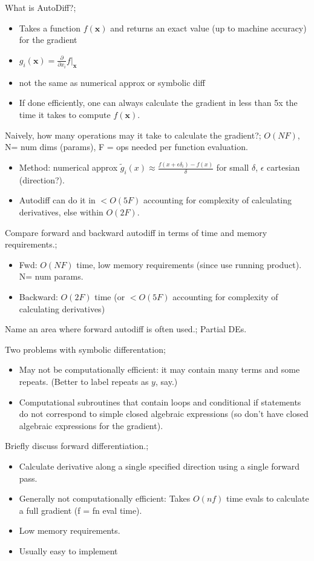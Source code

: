 \documentclass{article}
\begin{document}
What is AutoDiff?; \begin{itemize} \item Takes a function $f(\mathbf{x})$ and returns an exact value (up to machine accuracy) for the gradient \item $g_i(\mathbf{x})=\frac{\partial}{\partial x_i}f\vert_{\mathbf{x}}$ \item not the same as numerical approx or symbolic diff \item If done efficiently, one can always calculate the gradient in less than 5x the time it takes to compute $f(\mathbf{x})$.  \end{itemize}

Naively, how many operations may it take to calculate the gradient?; $O(NF)$, N= num dims (params), F = ops needed per function evaluation. \begin{itemize} \item Method: numerical approx $\tilde{g}_i(x) \approx \frac{f(x+\epsilon \delta_i)-f(x)}{\delta}$ for small $\delta$, $\epsilon$ cartesian (direction?).  \item Autodiff can do it in $<O(5F)$ accounting for complexity of calculating derivatives, else within $O(2F)$.  \end{itemize} 

Compare forward and backward autodiff in terms of time and memory requirements.; \begin{itemize} \item Fwd: $O(NF)$ time, low memory requirements (since use running product). N= num params.  \item Backward: $O(2F)$ time (or $<O(5F)$ accounting for complexity of calculating derivatives) \end{itemize} 

Name an area where forward autodiff is often used.; Partial DEs.

Two problems with symbolic differentation; \begin{itemize} \item May not be computationally efficient: it may contain many terms and some repeats. (Better to label repeats as $y$, say.) \item Computational subroutines that contain loops and conditional if statements do not correspond to simple closed algebraic expressions (so don't have closed algebraic expressions for the gradient).  \end{itemize}

Briefly discuss forward differentiation.; \begin{itemize} \item Calculate derivative along a single specified direction using a single forward pass.  \item Generally not computationally efficient: Takes $O(nf)$ time evals to calculate a full gradient (f = fn eval time).  \item Low memory requirements.  \item Usually easy to implement \end{itemize}
\end{document}
